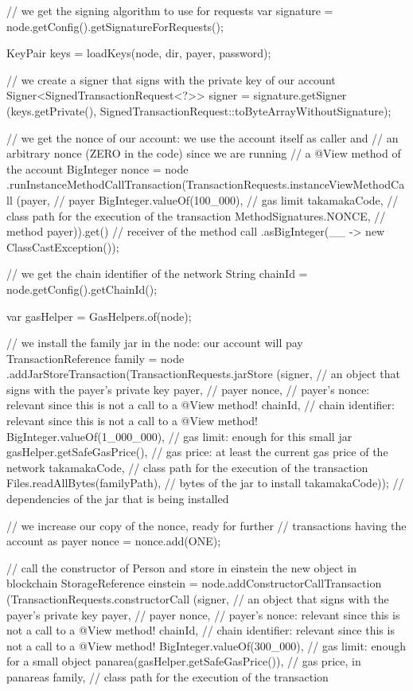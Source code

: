 \begin{codebox}
\begin{javalst}
{{{      // we get the signing algorithm to use for requests
      var signature = node.getConfig().getSignatureForRequests();

      KeyPair keys = loadKeys(node, dir, payer, password);

      // we create a signer that signs with the private key of our account
      Signer<SignedTransactionRequest<?>> signer = signature.getSigner
      (keys.getPrivate(), SignedTransactionRequest::toByteArrayWithoutSignature);

      // we get the nonce of our account: we use the account itself as caller and
      // an arbitrary nonce (ZERO in the code) since we are running
      // a @View method of the account
      BigInteger nonce = node
      .runInstanceMethodCallTransaction(TransactionRequests.instanceViewMethodCall
      (payer, // payer
      BigInteger.valueOf(100_000), // gas limit
      takamakaCode, // class path for the execution of the transaction
      MethodSignatures.NONCE, // method
      payer)).get() // receiver of the method call
      .asBigInteger(__ -> new ClassCastException());

      // we get the chain identifier of the network
      String chainId = node.getConfig().getChainId();

      var gasHelper = GasHelpers.of(node);

      // we install the family jar in the node: our account will pay
      TransactionReference family = node
      .addJarStoreTransaction(TransactionRequests.jarStore
      (signer, // an object that signs with the payer's private key
      payer, // payer
      nonce, // payer's nonce: relevant since this is not a call to a @View method!
      chainId, // chain identifier: relevant since this is not a call to a @View method!
      BigInteger.valueOf(1_000_000), // gas limit: enough for this small jar
      gasHelper.getSafeGasPrice(), // gas price: at least the current gas price of the network
      takamakaCode, // class path for the execution of the transaction
      Files.readAllBytes(familyPath), // bytes of the jar to install
      takamakaCode)); // dependencies of the jar that is being installed

      // we increase our copy of the nonce, ready for further
      // transactions having the account as payer
      nonce = nonce.add(ONE);

      // call the constructor of Person and store in einstein the new object in blockchain
      StorageReference einstein = node.addConstructorCallTransaction
      (TransactionRequests.constructorCall
      (signer, // an object that signs with the payer's private key
      payer, // payer
      nonce, // payer's nonce: relevant since this is not a call to a @View method!
      chainId, // chain identifier: relevant since this is not a call to a @View method!
      BigInteger.valueOf(300_000), // gas limit: enough for a small object
      panarea(gasHelper.getSafeGasPrice()), // gas price, in panareas
      family, // class path for the execution of the transaction

}}}
\end{javalst}
\end{codebox}
